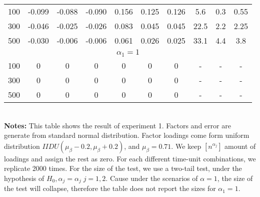 \begin{table}[!hbt]
\begin{tabular}{lccccccccc}
		\multicolumn{1}{l|}{100}                & -0.099 & -0.088 & \multicolumn{1}{c|}{-0.090} & 0.156 & 0.125 & \multicolumn{1}{c|}{0.126} & 5.6         & 0.3         & 0.55       \\
		\multicolumn{1}{l|}{300}                & -0.046 & -0.025 & \multicolumn{1}{c|}{-0.026} & 0.083 & 0.045 & \multicolumn{1}{c|}{0.045} & 22.5        & 2.2         & 2.25       \\
		\multicolumn{1}{l|}{500}                & -0.030 & -0.006 & \multicolumn{1}{c|}{-0.006} & 0.061 & 0.026 & \multicolumn{1}{c|}{0.025} & 33.1        & 4.4         & 3.8        \\ \hline
		\multicolumn{10}{c}{$\alpha_1=1$}                                                                                                                               \\ \hline
		\multicolumn{1}{l|}{100}                & 0      & 0      & \multicolumn{1}{c|}{0}      & 0     & 0     & \multicolumn{1}{c|}{0}     & -           & -           & -          \\
		\multicolumn{1}{l|}{300}                & 0      & 0      & \multicolumn{1}{c|}{0}      & 0     & 0     & \multicolumn{1}{c|}{0}     & -           & -           & -          \\
		\multicolumn{1}{l|}{500}                & 0      & 0      & \multicolumn{1}{c|}{0}      & 0     & 0     & \multicolumn{1}{c|}{0}     & -           & -           & -          \\ \hline
\hline
\end{tabular}
\bigskip\\
{\bf Notes:}
This table shows the result of  experiment 1.
Factors and error are generate from standard normal distribution.
Factor loadings come form uniform distribution $IIDU(\mu_{\beta} - 0.2, \mu_{\beta}+0.2)$, and $\mu_{\beta} = 0.71$.
We keep  $[n^{\alpha_{j}}]$ amount of loadings and assign the rest as zero.
For each different time-unit combinations, we replicate 2000 times.
For the size of the test, we use a two-tail test, under the hypothesis of $H_0, \hat{\alpha}_j = \alpha_j\; j=1,2$.
Cause under the scenarios of $\alpha = 1$, the size of the test will collapse, therefore the table does not report the sizes for $\alpha_1 = 1$.
\end{table}


